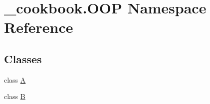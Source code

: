 \hypertarget{namespace__cookbook_1_1OOP}{\section{\-\_\-cookbook.\-O\-O\-P Namespace Reference}
\label{namespace__cookbook_1_1OOP}
}
\subsection*{Classes}
\begin{DoxyCompactItemize}
\item 
class \hyperlink{class__cookbook_1_1OOP_1_1A}{A}
\item 
class \hyperlink{class__cookbook_1_1OOP_1_1B}{B}
\end{DoxyCompactItemize}
